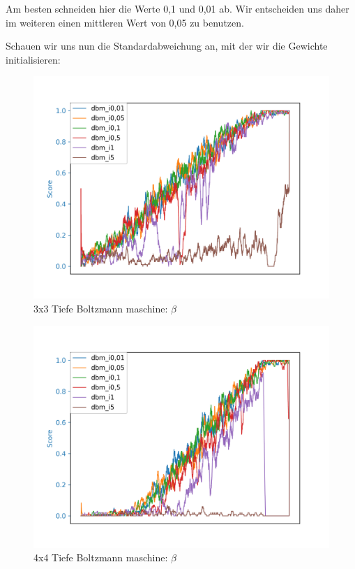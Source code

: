 Am besten schneiden hier die Werte 0,1 und 0,01 ab. Wir entscheiden uns daher im weiteren einen mittleren Wert von 0,05 zu benutzen.

Schauen wir uns nun die Standardabweichung an, mit der wir die Gewichte initialisieren:

\begin{figure}[H]
\centering
\includegraphics[width=\textwidth]{Figures/dbm8_3x3_dbm_i0,01_dbm_i0,05_dbm_i0,1_dbm_i0,5_dbm_i1_dbm_i5.png}
\caption{3x3 Tiefe Boltzmann maschine: $\beta$}
\label{dbm1}
\end{figure}

\begin{figure}[H]
\centering
\includegraphics[width=\textwidth]{Figures/dbm9_4x4_dbm_i0,01_dbm_i0,05_dbm_i0,1_dbm_i0,5_dbm_i1_dbm_i5.png}
\caption{4x4 Tiefe Boltzmann maschine: $\beta$}
\label{dbm1}
\end{figure}


